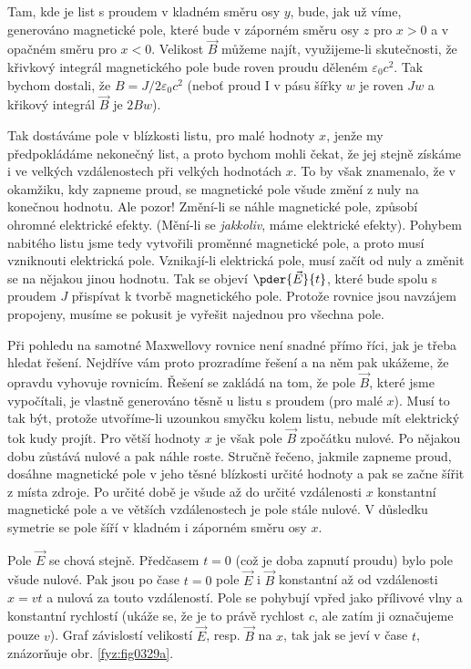   Tam, kde je list s proudem v kladném směru osy \(y\), bude, jak už víme, generováno magnetické 
  pole, které bude v záporném směru osy \(z\) pro \(x>0\) a v opačném směru pro \(x<0\). Velikost 
  \(\vec{B}\) můžeme najít, využijeme-li skutečnosti, že křivkový integrál magnetického pole bude 
  roven proudu děleném \(\varepsilon_0c^2\). Tak bychom dostali, že \(B=J/2\varepsilon_0c^2\) 
  (neboť proud I v pásu šířky \(w\) je roven \(Jw\) a křikový integrál \(\vec{B}\) je \(2Bw\)).
  
  Tak dostáváme pole v blízkosti listu, pro malé hodnoty \(x\), jenže my předpokládáme nekonečný 
  list, a proto bychom mohli čekat, že jej stejně získáme i ve velkých vzdálenostech při velkých 
  hodnotách \(x\). To by však znamenalo, že v okamžiku, kdy zapneme proud, se magnetické pole všude 
  změní z nuly na konečnou hodnotu. Ale pozor! Změní-li se náhle magnetické pole, způsobí ohromné 
  elektrické efekty. (Mění-li se \emph{jakkoliv}, máme elektrické efekty). Pohybem nabitého listu 
  jsme tedy vytvořili proměnné magnetické pole, a proto musí vzniknouti elektrická pole. 
  Vznikají-li elektrická pole, musí začít od nuly a změnit se na nějakou jinou hodnotu. Tak se 
  objeví \(\pder{\vec{E}}{t}\), které bude spolu s proudem \(J\) přispívat k tvorbě magnetického 
  pole. Protože rovnice jsou navzájem propojeny, musíme se pokusit je vyřešit najednou pro všechna 
  pole.
  
  Při pohledu na samotné Maxwellovy rovnice není snadné přímo říci, jak je třeba hledat řešení. 
  Nejdříve vám proto prozradíme řešení a na něm pak ukážeme, že opravdu vyhovuje rovnicím. Řešení 
  se zakládá na tom, že pole \(\vec{B}\), které jsme vypočítali, je vlastně generováno těsně u 
  listu s proudem (pro malé \(x\)). Musí to tak být, protože utvoříme-li uzounkou smyčku kolem 
  listu, nebude mít elektrický tok kudy projít. Pro větší hodnoty \(x\) je však pole \(\vec{B}\) 
  zpočátku nulové. Po nějakou dobu zůstává nulové a pak náhle roste. Stručně řečeno, jakmile 
  zapneme proud, dosáhne magnetické pole v jeho těsné blízkosti určité hodnoty a pak se začne šířit 
  z místa zdroje. Po určité době je všude až do určité vzdálenosti \(x\) konstantní magnetické pole 
  a ve větších vzdálenostech je pole stále nulové. V důsledku symetrie se pole šíří v kladném i 
  záporném směru osy \(x\).
 
  Pole \(\vec{E}\) se chová stejně. Předčasem \(t = 0\) (což je doba zapnutí proudu) bylo pole 
  všude nulové. Pak jsou po čase \(t=0\) pole \(\vec{E}\) i \(\vec{B}\) konstantní až od 
  vzdálenosti \(x = vt\) a nulová za touto vzdáleností. Pole se pohybují vpřed jako přílivové vlny 
  a konstantní rychlostí (ukáže se, že je to právě rychlost \(c\), ale zatím ji označujeme pouze 
  \(v\)). Graf závislostí velikostí \(\vec{E}\), resp. \(\vec{B}\) na \(x\), tak jak se jeví v 
  čase \(t\), znázorňuje obr. \ref{fyz:fig0329a}.
  
